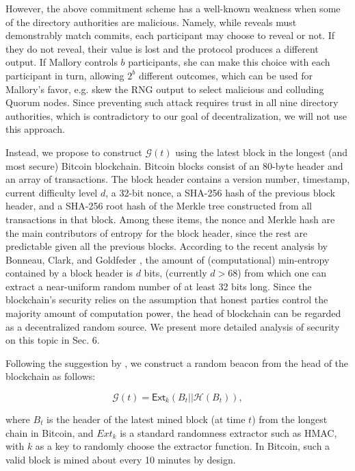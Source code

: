 \documentclass[USenglish,oneside,twocolumn]{article}
\begin{document}
However, the above commitment scheme has a well-known weakness when some of the directory authorities are malicious. Namely, while reveals must demonstrably match commits, each participant may choose to reveal or not. If they do not reveal, their value is lost and the protocol produces a different output. If Mallory controls $ b $ participants, she can make this choice with each participant in turn, allowing $ 2^{b} $ different outcomes, which can be used for Mallory's favor, e.g. skew the RNG output to select malicious and colluding Quorum nodes. Since preventing such attack requires trust in all nine directory authorities, which is contradictory to our goal of decentralization, we will not use this approach.

Instead, we propose to construct $ \mathcal{G}(t) $ using the latest block in the longest (and most secure) Bitcoin blockchain. Bitcoin blocks consist of an 80-byte header and an array of transactions. The block header contains a version number, timestamp, current difficulty level $d$, a 32-bit nonce, a SHA-256 hash of the previous block header, and a SHA-256 root hash of the Merkle tree constructed from all transactions in that block. Among these items, the nonce and Merkle hash are the main contributors of entropy for the block header, since the rest are predictable given all the previous blocks. According to the recent analysis by Bonneau, Clark, and Goldfeder \cite{BonneauCG15}, the amount of (computational) min-entropy contained by a block header is $ d $ bits, (currently $ d > 68 $) from which one can extract a near-uniform random number of at least 32 bits long. Since the blockchain's security relies on the assumption that honest parties control the majority amount of computation power, the head of blockchain can be regarded as a  decentralized random source. We present more detailed analysis of security on this topic in Sec. 6.

Following the suggestion by \cite{BonneauCG15}, we construct a random beacon from the head of the blockchain as follows:  

\begin{equation}
\mathcal{G}(t) = \mathsf{Ext}_k(B_t||\mathcal{H}(B_t)),
\end{equation}

\noindent where $B_t$ is the header of the latest mined block (at time $t$) from the longest chain in Bitcoin, and $\mathit{Ext}_k$ is a standard randomness extractor such as HMAC, with $k$ as a key to randomly choose the extractor function. In Bitcoin, such a valid block is mined about every 10 minutes by design.
\end{document}
